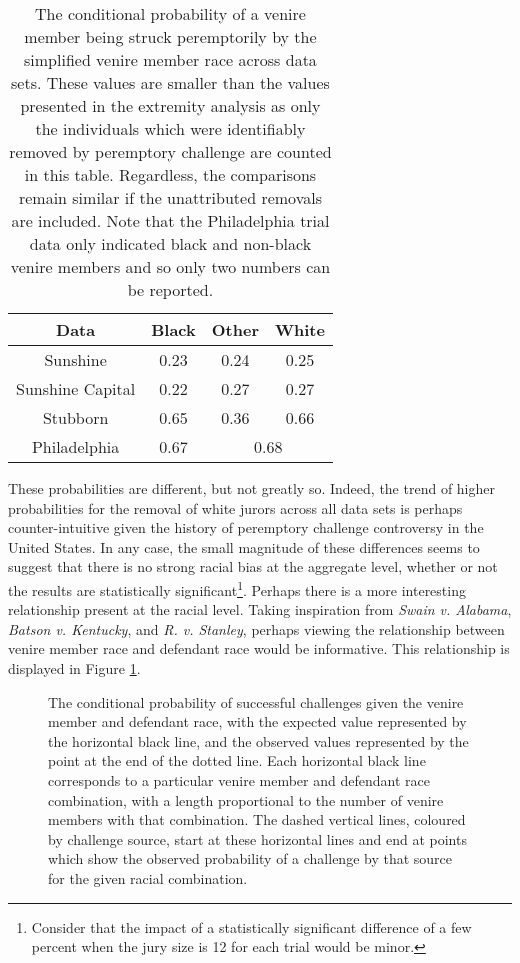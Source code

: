 \begin{table}[h!]
  \centering
  \caption[Strike Rate by Race]{\footnotesize The conditional probability of a venire member being struck peremptorily by the simplified venire
    member race across data sets. These values are smaller than the values presented in the extremity analysis as only the
    individuals which were identifiably removed by peremptory challenge are counted in this table. Regardless, the comparisons 
    remain similar if the unattributed removals are included. Note that the Philadelphia trial data only indicated black and
    non-black venire members and so only two numbers can be reported.} \label{tab:margrace}
  \begin{tabular}{|c|c c c|} \hline
    Data & Black & Other & White \\ \hline
    Sunshine & 0.23 & 0.24 & 0.25 \\
    Sunshine Capital & 0.22 & 0.27 & 0.27 \\
    Stubborn & 0.65 & 0.36 & 0.66 \\ 
    Philadelphia & 0.67 & \multicolumn{2}{c|}{0.68} \\ \hline
  \end{tabular}
\end{table}

These probabilities are different, but not greatly so. Indeed, the trend of higher probabilities for the removal of white jurors
across all data sets is perhaps counter-intuitive given the history of peremptory challenge controversy in the United States. In
any case, the small magnitude of these differences seems to suggest that there is no strong racial bias at the aggregate level,
whether or not the results are statistically significant\footnote{Consider that the impact of a statistically significant
  difference of a few percent when the jury size is 12 for each trial would be minor.}. Perhaps there is a more interesting
relationship present at the racial level. Taking inspiration from \textit{Swain v. Alabama}, \textit{Batson v. Kentucky}, and
\textit{R. v. Stanley}, perhaps viewing the relationship between venire member race and defendant race would be informative. This
relationship is displayed in Figure \ref{fig:racedefmob}.

\begin{figure}[!h]
  \centering
  \caption[The ``Mobile Plot'' of Racial Combination and
  Strikes (Sunshine)]{\footnotesize The conditional probability of successful challenges given the
    venire member and defendant race, with the expected value represented by the horizontal black line, and the observed values
    represented by the point at the end of the dotted line. Each horizontal black line corresponds to a particular venire member
    and defendant race combination, with a length proportional to the number of venire members with that combination. The dashed
    vertical lines, coloured by challenge source, start at these horizontal lines and end at points which show the observed
    probability of a challenge by that source for the given racial combination.}
  \label{fig:racedefmob}
\end{figure}

